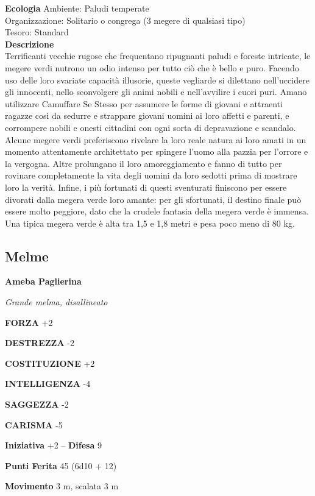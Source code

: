 \begin{multicols}{2}
\textbf{Ecologia}
Ambiente: Paludi temperate\\
Organizzazione: Solitario o congrega (3 megere di qualsiasi tipo)\\
Tesoro: Standard\\
\textbf{Descrizione}\\
Terrificanti vecchie rugose che frequentano ripugnanti paludi e foreste intricate, le megere verdi nutrono un odio intenso per tutto ciò che è bello e puro. Facendo uso delle loro svariate capacità illusorie, queste vegliarde si dilettano nell'uccidere gli innocenti, nello sconvolgere gli animi nobili e nell'avvilire i cuori puri. Amano utilizzare Camuffare Se Stesso per assumere le forme di giovani e attraenti ragazze così da sedurre e strappare giovani uomini ai loro affetti e parenti, e corrompere nobili e onesti cittadini con ogni sorta di depravazione e scandalo. Alcune megere verdi preferiscono rivelare la loro reale natura ai loro amati in un momento attentamente architettato per spingere l'uomo alla pazzia per l'orrore e la vergogna. Altre prolungano il loro amoreggiamento e fanno di tutto per rovinare completamente la vita degli uomini da loro sedotti prima di mostrare loro la verità. Infine, i più fortunati di questi sventurati finiscono per essere divorati dalla megera verde loro amante: per gli sfortunati, il destino finale può essere molto peggiore, dato che la crudele fantasia della megera verde è immensa. Una tipica megera verde è alta tra 1,5 e 1,8 metri e pesa poco meno di 80 kg.\\


\subsection{Melme}

\medskip{}\textbf{Ameba Paglierina}

\emph{Grande melma, disallineato}

\textbf{FORZA} +2

\textbf{DESTREZZA} -2

\textbf{COSTITUZIONE} +2

\textbf{INTELLIGENZA} -4

\textbf{SAGGEZZA} -2

\textbf{CARISMA} -5

\textbf{Iniziativa} +2 -- \textbf{Difesa} 9

\textbf{Punti Ferita} 45 (6d10 + 12)

\textbf{Movimento} 3 m, scalata 3 m


\end{multicols}
